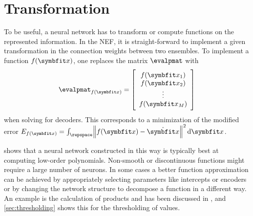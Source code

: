 \section{Transformation}
To be useful, a neural network has to transform or compute functions on the represented information.
In the NEF, it is straight-forward to implement a given transformation in the connection weights between two ensembles.
To implement a function $f(\vc x)$, one replaces the matrix $\evalpmat$ with
\begin{equation}
    \evalpmat_{f(\vc x)} = \sbr{\begin{array}{c}
            f(\vc x_1) \\ f(\vc x_2) \\ \vdots \\ f(\vc x_M)
    \end{array}}
\end{equation}
when solving for decoders.
This corresponds to a minimization of the modified error $E_{f(\vc x)} = \int_{\repspace} \norm{f(\vc x) - \hat{\vc x}}^2 \dif \vc x$.

\Textcite[Ch.~7]{eliasmith2003} shows that a neural network constructed in this way is typically best at computing low-order polynomials.
Non-smooth or discontinuous functions might require a large number of neurons.
In some cases a better function approximation can be achieved by appropriately selecting parameters like intercepts or encoders or by changing the network structure to decompose a function in a different way.
An example is the calculation of products and has been discussed in \textcite{gosmann2015-1}, and \cref{sec:thresholding} shows this for the thresholding of values.

